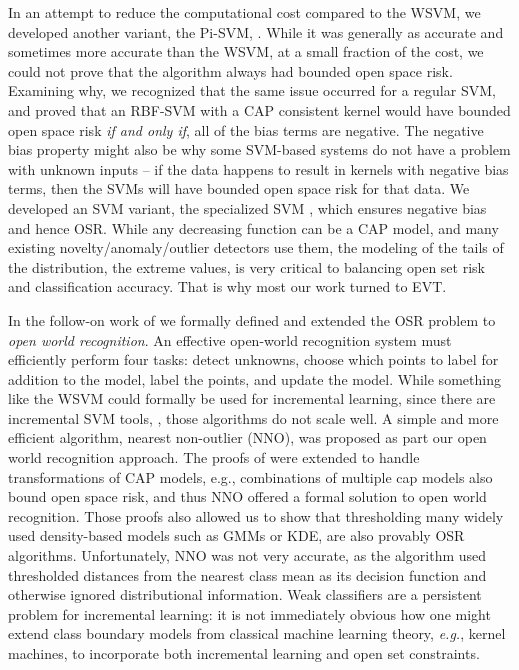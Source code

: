 \documentclass[letterpaper]{article}
\begin{document}
In an attempt to reduce the computational cost compared to the WSVM, we developed another variant, the Pi-SVM,  \cite{Lalit-eccv}.
While it was generally as accurate and sometimes more accurate than the WSVM, at a small fraction of the cost, we could not prove that the algorithm always had bounded open space risk.
Examining why, we recognized that the same issue occurred for a regular SVM, and proved that an RBF-SVM with a CAP consistent kernel would have bounded open space risk {\em if and only if}, all of the bias terms are negative.
The negative bias property might also be why some SVM-based systems do not have a problem with unknown inputs -- if the data happens to result in kernels with negative bias terms, then the SVMs will have bounded open space risk for that data. We developed an SVM variant, the specialized SVM  \cite{junior2016specialized}, which ensures negative bias and hence OSR. 
While any decreasing function can be a CAP model, and many existing novelty/anomaly/outlier detectors use them,  the modeling of the tails of the distribution, the extreme values, is very critical to balancing open set risk and classification accuracy.  That is why most our work turned to EVT.


In the follow-on work of  \cite{bendale2015towards} we formally defined
and extended the OSR problem to \textit{open world recognition}.  An
effective open-world recognition system must efficiently perform four
tasks: detect unknowns, choose which points to label for addition
to the model, label the points, and update the model.  While
something like the WSVM could formally be used for incremental
learning, since there are incremental SVM tools,
 \cite{caragea2000incremental}, those
algorithms do not scale well.   A simple and more efficient algorithm,
nearest non-outlier (NNO), was proposed as part our open
world recognition approach.   The proofs of  \cite{walter2014} were extended to handle transformations of CAP models, e.g., combinations of multiple cap models also bound open space risk, and thus NNO offered a formal solution to open world recognition.   Those proofs also allowed us to show that thresholding many widely used density-based models such as  GMMs or KDE, are also provably OSR algorithms. 
Unfortunately, NNO was not very accurate, as the algorithm used thresholded distances from the nearest class mean as its decision function and otherwise ignored distributional information.    Weak classifiers are a persistent problem for incremental learning: it is not immediately obvious how one might extend class boundary models from classical machine learning theory,  \textit{e.g.},  kernel machines, to incorporate both incremental learning and open set constraints. 
\end{document}
